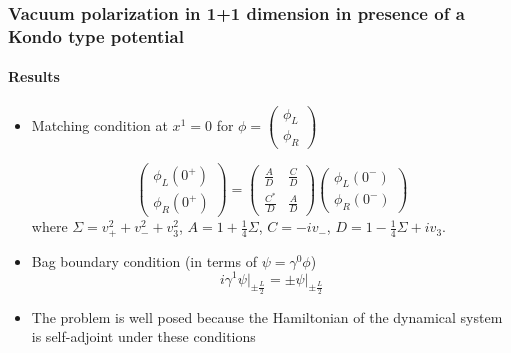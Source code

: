 \documentclass[french]{beamer}
\begin{document}
\begin{frame}
\frametitle{Vacuum polarization in 1+1 dimension in presence of a Kondo type potential}
\framesubtitle{Results}

\begin{itemize}
\item Matching condition at $x^1 = 0$ for $\phi =
\begin{pmatrix}
\phi_L \\
\phi_R
\end{pmatrix}$

\begin{equation*}
\begin{pmatrix}
\phi_L(0^+) \\
\phi_R(0^+)
\end{pmatrix} = \begin{pmatrix}
\frac{A}{D}  & \frac{C}{D} \\
\frac{C^*}{D} & \frac{A}{D}
\end{pmatrix}\begin{pmatrix}
\phi_L(0^-) \\
\phi_R(0^-)
\end{pmatrix}
\end{equation*}
where  $\Sigma = v_+ ^ 2 + v_- ^ 2 + v_3 ^ 2$, $A = 1+ \frac{1}{4}\Sigma$, $C = -iv_-$, $D = 1-\frac{1}{4}\Sigma + iv_3$.

\item Bag boundary condition (in terms of $\psi = \gamma^0\phi$)
\begin{equation*}
i\gamma^1 \psi \Big\vert_{\pm \frac{L}{2}} = \pm \psi \Big\vert_{\pm \frac{L}{2}}
\end{equation*}

\item The problem is well posed because the Hamiltonian of the dynamical system is self-adjoint under these conditions

\end{itemize}

\end{frame}
\end{document}
